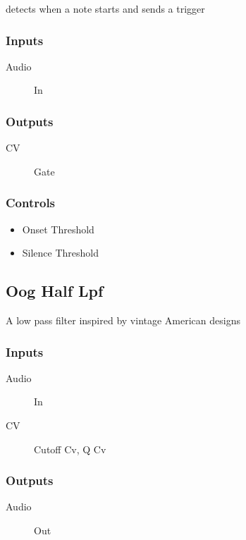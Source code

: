 detects when a note starts and sends a trigger



\subsubsection{Inputs}
\begin{description}
\item [Audio] In
\end{description}

\subsubsection{Outputs}
\begin{description}
\item [CV] Gate
\end{description}

\subsubsection{Controls}
\begin{itemize}
\item Onset Threshold
\item Silence Threshold
\end{itemize}

\subsection{Oog Half Lpf}

A low pass filter inspired by vintage American designs



\subsubsection{Inputs}
\begin{description}
\item [Audio] In
\item [CV] Cutoff Cv, Q Cv
\end{description}

\subsubsection{Outputs}
\begin{description}
\item [Audio] Out
\end{description}

